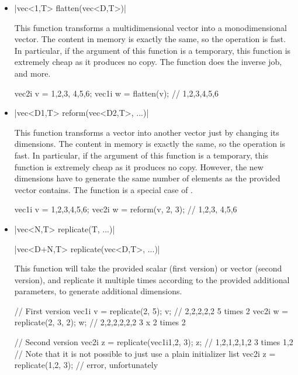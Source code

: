 \documentclass[12pt]{report}
\newenvironment{example}
{
    \begin{mdframed}[style=example,frametitle={Example}]
}
{
    \end{mdframed}
}
\begin{document}
\begin{itemize}
\item \cppinline|vec<1,T> flatten(vec<D,T>)| 

This function transforms a multidimensional vector into a monodimensional vector. The content in memory is exactly the same, so the operation is fast. In particular, if the argument of this function is a temporary, this function is extremely cheap as it produces no copy. The  function does the inverse job, and more.

\begin{example}
\begin{cppcode}
vec2i v = {{1,2,3}, {4,5,6}};
vec1i w = flatten(v); // {1,2,3,4,5,6}
\end{cppcode}
\end{example}

\item \cppinline|vec<D1,T> reform(vec<D2,T>, ...)| 

This function transforms a vector into another vector just by changing its dimensions. The content in memory is exactly the same, so the operation is fast. In particular, if the argument of this function is a temporary, this function is extremely cheap as it produces no copy. However, the new dimensions have to generate the same number of elements as the provided vector contains. The  function is a special case of .

\begin{example}
\begin{cppcode}
vec1i v = {1,2,3,4,5,6};
vec2i w = reform(v, 2, 3); // {{1,2,3}, {4,5,6}}
\end{cppcode}
\end{example}

\item \cppinline|vec<N,T>   replicate(T, ...)| 

      \cppinline|vec<D+N,T> replicate(vec<D,T>, ...)|


This function will take the provided scalar (first version) or vector (second version), and replicate it multiple times according to the provided additional parameters, to generate additional dimensions.

\begin{example}
\begin{cppcode}
// First version
vec1i v = replicate(2, 5);
v; // {2,2,2,2,2} 5 times 2
vec2i w = replicate(2, 3, 2);
w; // {{2,2},{2,2},{2,2}} 3 x 2 times 2

// Second version
vec2i z = replicate(vec1i{1,2}, 3);
z; // {{1,2},{1,2},{1,2}} 3 times {1,2}
// Note that it is not possible to just use a plain initializer list
vec2i z = replicate({1,2}, 3); // error, unfortunately
\end{cppcode}
\end{example}
\end{itemize}
\end{document}

